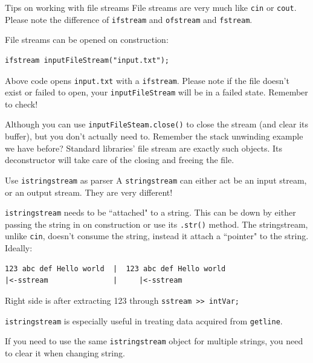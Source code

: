 \begin{frame}[fragile]{Tips on working with file streams}
File streams are very much like \texttt{cin} or \texttt{cout}. Please note the difference of \texttt{ifstream} and \texttt{ofstream} and \texttt{fstream}. 

File streams can be opened on construction:
\begin{verbatim}
ifstream inputFileStream("input.txt");
\end{verbatim}
Above code opens \texttt{input.txt} with a \texttt{ifstream}. Please note if the file doesn't exist or failed to open, your \texttt{inputFileStream} will be in a failed state. Remember to check!

Although you can use \texttt{inputFileSteam.close()} to close the stream (and clear its buffer), but you don't actually need to. Remember the stack unwinding example we have before? Standard libraries' file stream are exactly such objects. Its deconstructor will take care of the closing and freeing the file.
\end{frame}

\begin{frame}[fragile]{Use \texttt{istringstream} as parser }
A \texttt{stringstream} can either act be an input stream, or an output stream. They are very different! 

\texttt{istringstream} needs to be ``attached" to a string. This can be down by either passing the string in on construction or use its \texttt{.str()} method. The stringstream, unlike \texttt{cin}, doesn't consume the string, instead it attach a ``pointer" to the string. Ideally:

\begin{verbatim}
123 abc def Hello world  |  123 abc def Hello world
|<-sstream               |     |<-sstream 
\end{verbatim}

Right side is after extracting 123 through \texttt{sstream >> intVar;}

\texttt{istringstream} is especially useful in treating data acquired from \texttt{getline}. 

\alert{If you need to use the same \texttt{istringstream} object for multiple strings, you need to clear it when changing string}. 
\end{frame}

